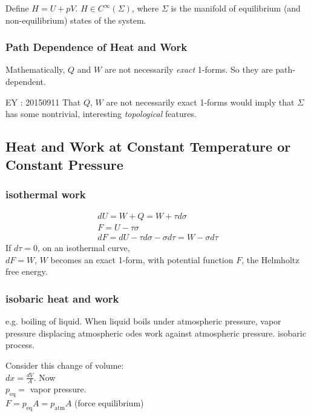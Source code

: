\documentclass[twoside]{amsart}
\theoremstyle{plain}
\theoremstyle{definition}
\begin{document}
Define $H = U + pV$.  $H \in C^{\infty}(\Sigma)$, where $\Sigma$ is the manifold of equilibrium (and non-equilibrium) states of the system.  

\subsubsection*{Path Dependence of Heat and Work}

Mathematically, $Q$ and $W$ are not necessarily \emph{exact} 1-forms.  So they are path-dependent.

EY : 20150911 That $Q$, $W$ are not necessarily exact 1-forms would imply that $\Sigma$ has some nontrivial, interesting \emph{topological} features.  

\subsection*{Heat and Work at Constant Temperature or Constant Pressure}

\subsubsection*{isothermal work}

\[
\begin{gathered}
  dU = W + Q = W + \tau d\sigma \\ 
  F = U-\tau \sigma \\ 
  dF = dU - \tau d\sigma - \sigma d\tau = W -\sigma d\tau
\end{gathered}
\]
If $d\tau =0$, on an isothermal curve, \\
$dF = W$, $W$ becomes an exact 1-form, with potential function $F$, the Helmholtz free energy.

\subsubsection*{isobaric heat and work}

e.g. boiling of liquid.  When liquid boils under atmospheric pressure, vapor pressure displacing atmospheric odes work against atmospheric pressure.  isobaric process.

Consider this change of volume: \\
$dx = \frac{dV}{A}$.  Now \\
$p_{\text{eq}} = $ vapor pressure.  \\

$F = p_{\text{eq}}A = p_{\text{atm}}A$ (force equilibrium)
\end{document}
